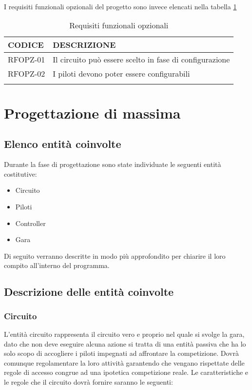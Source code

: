 \documentclass[a4paper,11pt, twoside]{book}
\begin{document}
    I requisiti funzionali opzionali del progetto sono invece elencati nella tabella \ref{tbl:RequisitiFunzionaliOpzionali}
    
    \begin{longtable}{|p{2cm}|p{8cm}|}
      \toprule
	\bfseries{CODICE} & \bfseries{DESCRIZIONE} \\\hline
      \endfirsthead
      RFOPZ-01 & Il circuito può essere scelto in fase di configurazione \\\cline{1-2}
      RFOPZ-02 & I piloti devono poter essere configurabili \\\cline{1-2}
      \caption{Requisiti funzionali opzionali}
      \label{tbl:RequisitiFunzionaliOpzionali}
    \end{longtable}
    
  
  \chapter{Progettazione di massima}
    \section{Elenco entità coinvolte}
      Durante la fase di progettazione sono state individuate le seguenti entità costitutive:
      
      \begin{itemize}
        \item Circuito
        \item Piloti
        \item Controller
        \item Gara 
      \end{itemize}
      
      Di seguito verranno descritte in modo più approfondito per chiarire il loro compito all'interno del
      programma.
      
    \section{Descrizione delle entità coinvolte}
      \subsection{Circuito}
        L'entità circuito rappresenta il circuito vero e proprio nel quale si svolge la gara, dato che non deve 
        eseguire alcuna azione si
        tratta di una entità passiva che ha lo solo scopo di accogliere i piloti impegnati ad affrontare la
        competizione.
        Dovrà comunque regolamentare la loro attività garantendo che vengano rispettate delle regole di accesso congrue
        ad una ipotetica competizione reale. 
        Le caratteristiche e le regole che il circuito dovrà fornire saranno le seguenti:
        
\end{document}
